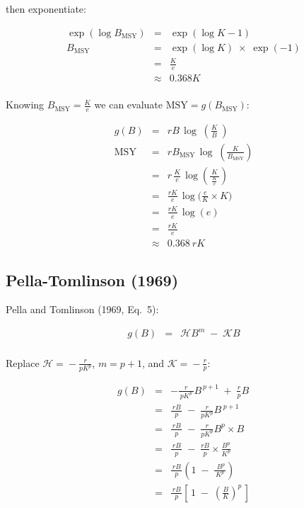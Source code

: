 \documentclass[fleqn]{article}
\newcommand{\MSY}{\mathrm{MSY}}
\newcommand{\msy}{_\mathrm{MSY}}
\begin{document}
then exponentiate:

\begin{eqnarray*}
  \exp(\log B\msy) &=&       \exp(\log K-1)                  \\[1em]
  B\msy            &=&       \exp(\log K) \;\times\; \exp(-1)\\[1em]
  ~                &=&       \frac{K}{e}                     \\[1em]
  ~                &\approx& 0.368K                          \\[1ex]
\end{eqnarray*}

Knowing $B\msy\!=\!\frac{K}{e}$ we can evaluate $\MSY\!=\!g(B\msy)$:

\begin{eqnarray*}
  g(B) &=&       rB\,\log\;\!\!\!\left(\!\frac{K}{B}\:\!\!\right)       \\[1em]
  \MSY &=&       rB\msy\,\log\;\!\!\!\left(\!\frac{K}{B\msy}\!\right)   \\[1em]
  ~    &=&       r\,\frac{K}{e}\,\log\!
  \left(\!\frac{\:K\:}{\frac{K}{e}}\!\right)                            \\[1em]
  ~    &=&       \frac{rK}{e}\,\log\!\bigg(\!\frac{e}{K}\times K\!\bigg)\\[1em]
  ~    &=&       \frac{rK}{e}\,\log(e)                                  \\[1em]
  ~    &=&       \frac{rK}{e}                                           \\[1em]
  ~    &\approx& 0.368\:rK
\end{eqnarray*}

\newpage

\subsection{Pella-Tomlinson (1969)}

Pella and Tomlinson (1969, Eq.~5):

\begin{eqnarray*}
  g(B) &=& \mathcal{H}B^m \;-\; \mathcal{K}B\\[1ex]
\end{eqnarray*}

Replace $\mathcal{H}\!=\!-\frac{r}{pK^p}$, $m\!=\!p\!+\!1$, and
$\mathcal{K}\!=\!-\frac{r}{p}$:

\begin{eqnarray*}
  g(B) &=& -\frac{r}{\,pK^p\,}B^{\,p+1} \;+\; \frac{r}{p}B             \\[1em]
  ~    &=& \frac{\,rB\,}{p} \;-\; \frac{r}{pK^p}B^{\;\!p+1}            \\[1em]
  ~    &=& \frac{\,rB\,}{p} \;-\; \frac{r}{pK^p}B^p\!\times\!B         \\[1em]
  ~    &=& \frac{\,rB\,}{p} \;-\; \frac{rB}{p}\!\times\!\frac{B^p}{K^p}\\[1em]
  ~    &=& \frac{\,rB\,}{p}\left(1 \;-\; \frac{\;B^p}{\,K^p\,}\right)  \\[1em]
  ~    &=& \frac{\,rB\,}{p}\!
  \left[\,1 \;-\; \left(\frac{B}{K}\right)^{\!p}\,\right]
\end{eqnarray*}
\end{document}
